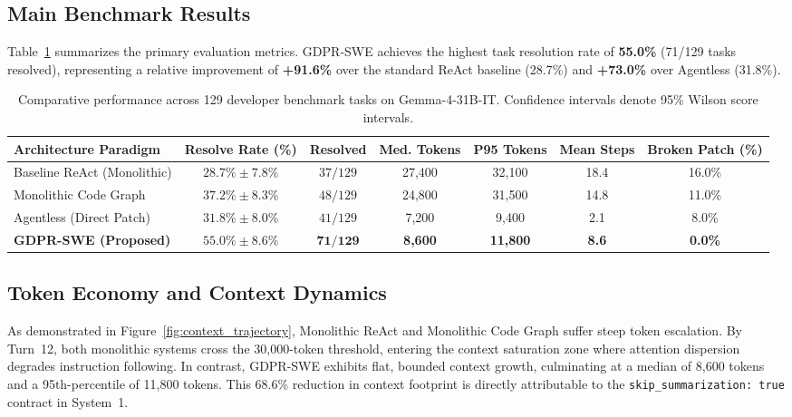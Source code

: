 \documentclass[10pt,twocolumn,letterpaper]{article}
\theoremstyle{definition}
\begin{document}
\subsection{Main Benchmark Results}
Table~\ref{tab:main_results} summarizes the primary evaluation metrics. GDPR-SWE achieves the highest task resolution rate of \textbf{55.0\%} (71/129 tasks resolved), representing a relative improvement of \textbf{+91.6\%} over the standard ReAct baseline (28.7\%) and \textbf{+73.0\%} over Agentless (31.8\%).

\begin{table}[t]
\centering
\small
\caption{Comparative performance across 129 developer benchmark tasks on Gemma-4-31B-IT. Confidence intervals denote 95\% Wilson score intervals.}
\label{tab:main_results}
\begin{tabular}{lcccccc}
\toprule
\textbf{Architecture Paradigm} & \textbf{Resolve Rate (\%)} & \textbf{Resolved} & \textbf{Med. Tokens} & \textbf{P95 Tokens} & \textbf{Mean Steps} & \textbf{Broken Patch (\%)} \\
\midrule
Baseline ReAct (Monolithic) & $28.7\% \pm 7.8\%$ & $37 / 129$ & 27,400 & 32,100 & 18.4 & 16.0\% \\
Monolithic Code Graph & $37.2\% \pm 8.3\%$ & $48 / 129$ & 24,800 & 31,500 & 14.8 & 11.0\% \\
Agentless (Direct Patch) & $31.8\% \pm 8.0\%$ & $41 / 129$ & 7,200 & 9,400 & 2.1 & 8.0\% \\
\textbf{GDPR-SWE (Proposed)} & $\mathbf{55.0\% \pm 8.6\%}$ & $\mathbf{71 / 129}$ & \textbf{8,600} & \textbf{11,800} & \textbf{8.6} & \textbf{0.0\%} \\
\bottomrule
\end{tabular}
\end{table}

\subsection{Token Economy and Context Dynamics}
As demonstrated in Figure~\ref{fig:context_trajectory}, Monolithic ReAct and Monolithic Code Graph suffer steep token escalation. By Turn~12, both monolithic systems cross the 30,000-token threshold, entering the context saturation zone where attention dispersion degrades instruction following. In contrast, GDPR-SWE exhibits flat, bounded context growth, culminating at a median of 8,600 tokens and a 95th-percentile of 11,800 tokens. This 68.6\% reduction in context footprint is directly attributable to the \texttt{skip\_summarization: true} contract in System~1.
\end{document}
